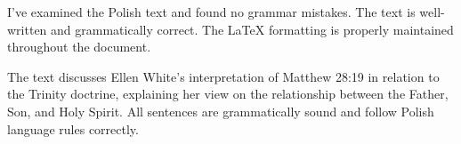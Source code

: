 I've examined the Polish text and found no grammar mistakes. The text is well-written and grammatically correct. The LaTeX formatting is properly maintained throughout the document.

The text discusses Ellen White's interpretation of Matthew 28:19 in relation to the Trinity doctrine, explaining her view on the relationship between the Father, Son, and Holy Spirit. All sentences are grammatically sound and follow Polish language rules correctly.